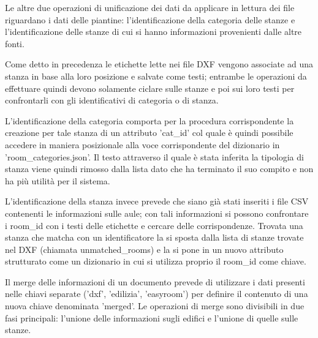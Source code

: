 \documentclass[12pt]{report}
\begin{document}
\vspace{5mm} %

Le altre due operazioni di unificazione dei dati da applicare in lettura dei file riguardano i dati delle piantine: l'identificazione della categoria delle stanze e l'identificazione delle stanze di cui si hanno informazioni provenienti dalle altre fonti.

Come detto in precedenza le etichette lette nei file DXF vengono associate ad una stanza in base alla loro posizione e salvate come testi; entrambe le operazioni da effettuare quindi devono solamente ciclare sulle stanze e poi sui loro testi per confrontarli con gli identificativi di categoria o di stanza.

L'identificazione della categoria comporta per la procedura corrispondente la creazione per tale stanza di un attributo 'cat\_id' col quale è quindi possibile accedere in maniera posizionale alla voce corrispondente del dizionario in 'room\_categories.json'. 
Il testo attraverso il quale è stata inferita la tipologia di stanza viene quindi rimosso dalla lista dato che ha terminato il suo compito e non ha più utilità per il sistema.

L'identificazione della stanza invece prevede che siano già stati inseriti i file CSV contenenti le informazioni sulle aule; con tali informazioni si possono confrontare i room\_id con i testi delle etichette e cercare delle corrispondenze.
Trovata una stanza che matcha con un identificatore la si sposta dalla lista di stanze trovate nel DXF (chiamata unmatched\_rooms) e la si pone in un nuovo attributo strutturato come un dizionario in cui si utilizza proprio il room\_id come chiave. 

\vspace{5mm} %

Il merge delle informazioni di un documento prevede di utilizzare i dati presenti nelle chiavi separate ('dxf', 'edilizia', 'easyroom') per definire il contenuto di una nuova chiave denominata 'merged'.
Le operazioni di merge sono divisibili in due fasi principali: l'unione delle informazioni sugli edifici e l'unione di quelle sulle stanze.
\end{document}
